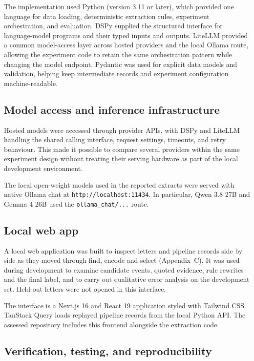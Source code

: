 \documentclass[conference]{IEEEtran}
\begin{document}
The implementation used Python (version 3.11 or later), which provided one
language for data loading, deterministic extraction rules, experiment
orchestration, and evaluation. DSPy supplied the structured interface for
language-model programs and their typed inputs and outputs. LiteLLM provided
a common model-access layer across hosted providers and the local Ollama
route, allowing the experiment code to retain the same orchestration pattern
while changing the model endpoint. Pydantic was used for explicit data
models and validation, helping keep intermediate records and experiment
configuration machine-readable. 

\subsection{Model access and inference infrastructure}

Hosted models were accessed through provider APIs, with DSPy and LiteLLM
handling the shared calling interface, request settings, timeouts, and retry
behaviour. This made it possible to compare several providers within the
same experiment design without treating their serving hardware as part of
the local development environment. 

The local open-weight models used in the reported extracts were served with
native Ollama chat at \texttt{http://localhost:11434}. In particular, Qwen
3.8 27B and Gemma 4 26B used the \texttt{ollama\_chat/...} route.

\subsection{Local web app}

A local web application was built to inspect letters and
pipeline records side by side as they moved through find, encode
and select (Appendix~C). It was used during development
to examine candidate events, quoted evidence, rule rewrites
and the final label, and to carry out qualitative error analysis
on the development set. Held-out letters were not opened in
this interface.

The interface is a Next.js 16 and React 19 application styled
with Tailwind CSS. TanStack Query loads replayed pipeline
records from the local Python API. The assessed repository
includes this frontend alongside the extraction code.

\subsection{Verification, testing, and reproducibility}
\end{document}
